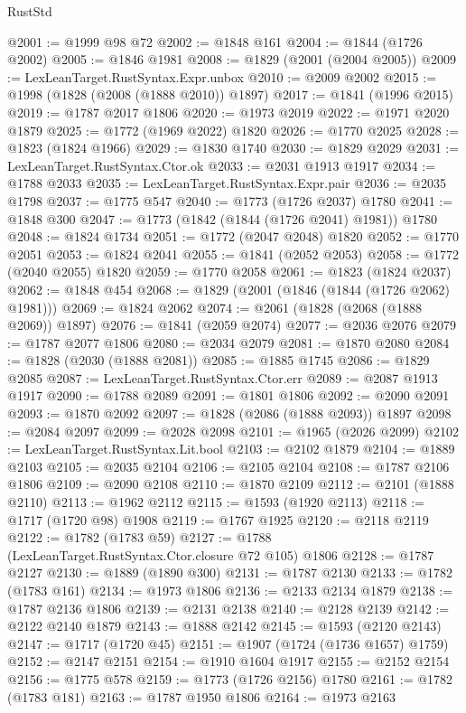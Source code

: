 \begin{lexlean}{RustStd}
\begin{coremodule}
@2001 := @1999 @98 @72
@2002 := @1848 @161
@2004 := @1844 (@1726 @2002)
@2005 := @1846 @1981
@2008 := @1829 (@2001 (@2004 @2005))
@2009 := LexLeanTarget.RustSyntax.Expr.unbox
@2010 := @2009 @2002
@2015 := @1998 (@1828 (@2008 (@1888 @2010)) @1897)
@2017 := @1841 (@1996 @2015)
@2019 := @1787 @2017 @1806
@2020 := @1973 @2019
@2022 := @1971 @2020 @1879
@2025 := @1772 (@1969 @2022) @1820
@2026 := @1770 @2025
@2028 := @1823 (@1824 @1966)
@2029 := @1830 @1740
@2030 := @1829 @2029
@2031 := LexLeanTarget.RustSyntax.Ctor.ok
@2033 := @2031 @1913 @1917
@2034 := @1788 @2033
@2035 := LexLeanTarget.RustSyntax.Expr.pair
@2036 := @2035 @1798
@2037 := @1775 @547
@2040 := @1773 (@1726 @2037) @1780
@2041 := @1848 @300
@2047 := @1773 (@1842 (@1844 (@1726 @2041) @1981)) @1780
@2048 := @1824 @1734
@2051 := @1772 (@2047 @2048) @1820
@2052 := @1770 @2051
@2053 := @1824 @2041
@2055 := @1841 (@2052 @2053)
@2058 := @1772 (@2040 @2055) @1820
@2059 := @1770 @2058
@2061 := @1823 (@1824 @2037)
@2062 := @1848 @454
@2068 := @1829 (@2001 (@1846 (@1844 (@1726 @2062) @1981)))
@2069 := @1824 @2062
@2074 := @2061 (@1828 (@2068 (@1888 @2069)) @1897)
@2076 := @1841 (@2059 @2074)
@2077 := @2036 @2076
@2079 := @1787 @2077 @1806
@2080 := @2034 @2079
@2081 := @1870 @2080
@2084 := @1828 (@2030 (@1888 @2081))
@2085 := @1885 @1745
@2086 := @1829 @2085
@2087 := LexLeanTarget.RustSyntax.Ctor.err
@2089 := @2087 @1913 @1917
@2090 := @1788 @2089
@2091 := @1801 @1806
@2092 := @2090 @2091
@2093 := @1870 @2092
@2097 := @1828 (@2086 (@1888 @2093)) @1897
@2098 := @2084 @2097
@2099 := @2028 @2098
@2101 := @1965 (@2026 @2099)
@2102 := LexLeanTarget.RustSyntax.Lit.bool
@2103 := @2102 @1879
@2104 := @1889 @2103
@2105 := @2035 @2104
@2106 := @2105 @2104
@2108 := @1787 @2106 @1806
@2109 := @2090 @2108
@2110 := @1870 @2109
@2112 := @2101 (@1888 @2110)
@2113 := @1962 @2112
@2115 := @1593 (@1920 @2113)
@2118 := @1717 (@1720 @98) @1908
@2119 := @1767 @1925
@2120 := @2118 @2119
@2122 := @1782 (@1783 @59)
@2127 := @1788 (LexLeanTarget.RustSyntax.Ctor.closure @72 @105) @1806
@2128 := @1787 @2127
@2130 := @1889 (@1890 @300)
@2131 := @1787 @2130
@2133 := @1782 (@1783 @161)
@2134 := @1973 @1806
@2136 := @2133 @2134 @1879
@2138 := @1787 @2136 @1806
@2139 := @2131 @2138
@2140 := @2128 @2139
@2142 := @2122 @2140 @1879
@2143 := @1888 @2142
@2145 := @1593 (@2120 @2143)
@2147 := @1717 (@1720 @45)
@2151 := @1907 (@1724 (@1736 @1657) @1759)
@2152 := @2147 @2151
@2154 := @1910 @1604 @1917
@2155 := @2152 @2154
@2156 := @1775 @578
@2159 := @1773 (@1726 @2156) @1780
@2161 := @1782 (@1783 @181)
@2163 := @1787 @1950 @1806
@2164 := @1973 @2163

\end{coremodule}
\end{lexlean}
